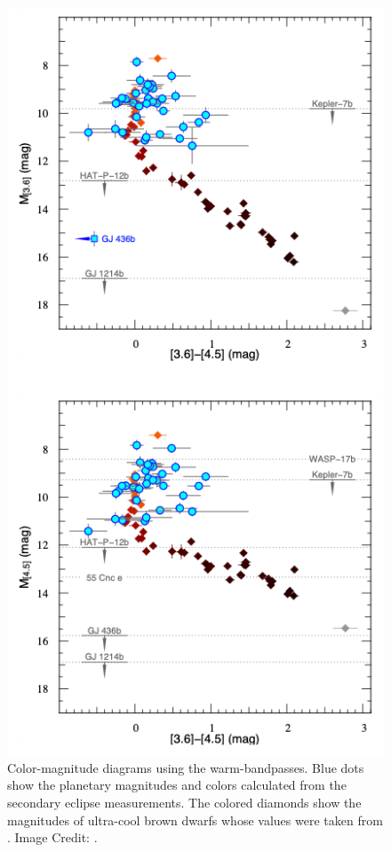 \begin{figure}
    \centering
    \includegraphics[height = 0.9\textheight]{triaud.png}
    \caption{Color-magnitude diagrams using the warm-\spitzer bandpasses. Blue dots show the planetary magnitudes and colors calculated from the secondary eclipse measurements. The colored diamonds show the magnitudes of ultra-cool brown dwarfs whose values were taken from \citet{Dupuy2012}. Image Credit: \citet{Triaud2014c}.}
    \label{int:fig:triaud}
\end{figure}

